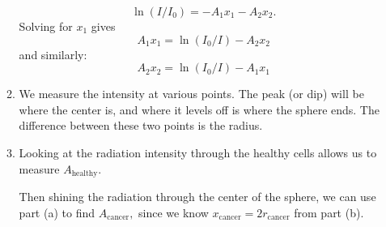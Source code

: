 \documentclass{article}
\begin{document}
\begin{enumerate}
\begin{enumerate}
        \begin{equation}
            \ln(I/I_0)=-A_1x_1-A_2x_2.
        \end{equation}
        Solving for $x_1$ gives 
        \begin{equation}
            A_1x_1 = \ln(I_0/I)-A_2x_2
        \end{equation}
        and similarly:
        \begin{equation}
            A_2x_2 = \ln(I_0/I)-A_1x_1
        \end{equation}
        \item We measure the intensity at various points. The peak (or dip) will be where the center is, and where it levels off is where the sphere ends. The difference between these two points is the radius.
        \item Looking at the radiation intensity through the healthy cells allows us to measure $A_\text{healthy}.$
        
        Then shining the radiation through the center of the sphere, we can use part (a) to find $A_\text{cancer},$ since we know $x_\text{cancer}=2r_\text{cancer}$ from part (b).
    \end{enumerate}
    
\end{enumerate}
\end{document}
